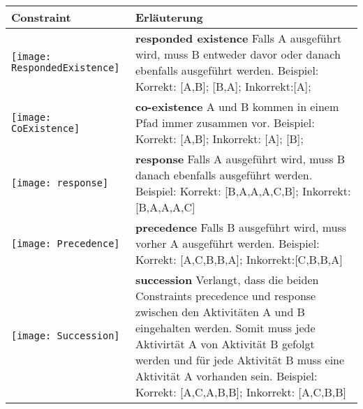 
\begin{tabular}{|p{}|p{}|}
\hline
\textbf{Constraint} & \textbf{Erläuterung}\\
\hline

\begin{center}

  \texttt{[image: RespondedExistence]} %
    \end{center}&

\textbf{responded existence} \newline  Falls A ausgeführt wird, muss B entweder davor oder danach ebenfalls ausgeführt werden. \newline
Beispiel: Korrekt: [A,B]; [B,A]; Inkorrekt:[A];
\\
\hline
\begin{center}

  \texttt{[image: CoExistence]} %
    \end{center} &
\textbf{co-existence} \newline A und B kommen in einem Pfad immer zusammen vor.\newline
Beispiel: Korrekt: [A,B]; Inkorrekt: [A]; [B];
 \\
\hline

\begin{center}

  \texttt{[image: response]} %
    \end{center} &
\textbf{response} \newline Falls A ausgeführt wird, muss B danach ebenfalls ausgeführt werden. \newline
Beispiel: Korrekt: [B,A,A,A,C,B]; Inkorrekt: [B,A,A,A,C]
\\
\hline
\begin{center}

  \texttt{[image: Precedence]} %
    \end{center} &
    \textbf{precedence}\newline
Falls B  ausgeführt wird, muss vorher A ausgeführt werden. \newline
Beispiel: Korrekt: [A,C,B,B,A]; Inkorrekt:[C,B,B,A]
\\
\hline
\begin{center}

  \texttt{[image: Succession]} %
    \end{center}&
\textbf{succession} \newline Verlangt, dass die beiden Constraints precedence und response zwischen den Aktivitäten A und B eingehalten werden. Somit muss jede Aktivirtät A von Aktivität B gefolgt werden und für jede Aktivität B muss eine Aktivität A vorhanden sein. \newline
Beispiel: Korrekt: [A,C,A,B,B]; Inkorrekt: [A,C,B,B]\\
\hline
\end{tabular}
